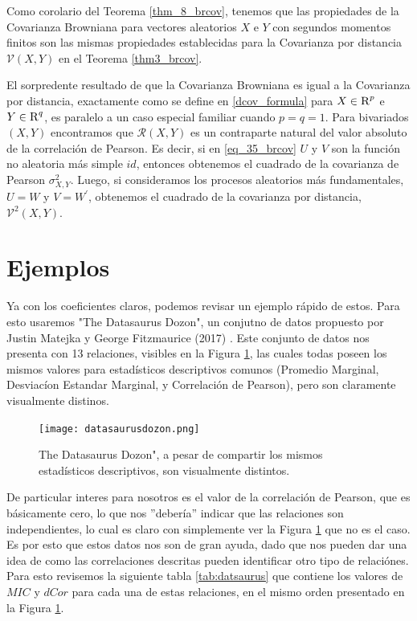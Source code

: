 	Como corolario del Teorema \ref{thm_8_brcov}, tenemos que las propiedades de la Covarianza Browniana para vectores aleatorios $X$ e $Y$ con segundos momentos finitos son las mismas propiedades establecidas para la Covarianza por distancia $\mathcal{V}(X, Y)$ en el Teorema \ref{thm3_brcov}.
	
	El sorpredente resultado de que la Covarianza Browniana es igual a la Covarianza por distancia, exactamente como se define en \ref{dcov_formula} para $X \in \textsc{R}^p$ e $Y \in \textsc{R}^q$, es paralelo a un caso especial familiar cuando $p=q=1$. Para bivariados $(X, Y)$ encontramos que $\mathcal{R}(X, Y)$ es un contraparte natural del valor absoluto de la correlaci\'on de Pearson. Es decir, si en \ref{eq_35_brcov} $U$ y $V$ son la funci\'on no aleatoria m\'as simple $id$, entonces obtenemos el cuadrado de la covarianza de Pearson $\sigma_{X, Y}^2$. Luego, si consideramos los procesos aleatorios m\'as fundamentales, $U=W$ y $V=W^{\prime}$, obtenemos el cuadrado de la covarianza por distancia, $\mathcal{V}^2(X, Y)$.


    \section{Ejemplos}

    Ya con los coeficientes claros, podemos revisar un ejemplo r\'apido de estos. Para esto usaremos "The Datasaurus Dozon", un conjutno de datos propuesto por Justin Matejka y George Fitzmaurice (2017) \cite{datasaurus}. Este conjunto de datos nos presenta con 13 relaciones, visibles en la Figura \ref{datasaurus_fig}, las cuales todas poseen los mismos valores para estad\'isticos descriptivos comunos (Promedio Marginal, Desviac\'ion Estandar Marginal, y Correlaci\'on de Pearson), pero son claramente visualmente distinos.

    \begin{figure} 
        \centering
        \texttt{[image: datasaurusdozon.png]}
        \caption{The Datasaurus Dozon", a pesar de compartir los mismos estad\'isticos descriptivos, son visualmente distintos.}
        \label{datasaurus_fig}
    \end{figure}

    De particular interes para nosotros es el valor de la correlaci\'on de Pearson, que es b\'asicamente cero, lo que nos ''deber\'ia'' indicar que las relaciones son independientes, lo cual es claro con simplemente ver la Figura \ref{datasaurus_fig} que no es el caso. Es por esto que estos datos nos son de gran ayuda, dado que nos pueden dar una idea de como las correlaciones descritas pueden identificar otro tipo de relaci\'ones. Para esto revisemos la siguiente tabla \ref{tab:datsaurus} que contiene los valores de $MIC$ y $dCor$ para cada una de estas relaciones, en el mismo orden presentado en la Figura \ref{datasaurus_fig}.

